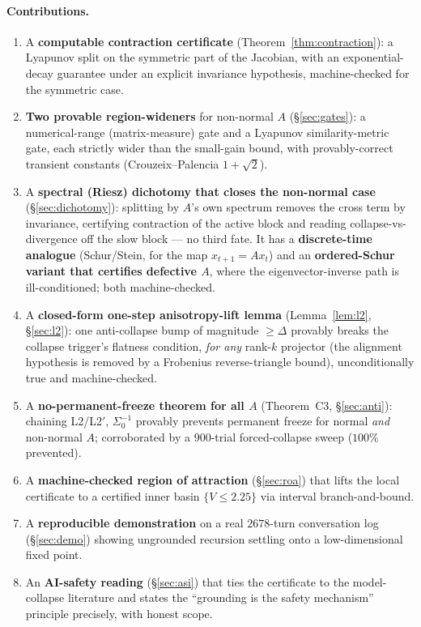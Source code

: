 \documentclass[11pt]{article}
\theoremstyle{definition}
\begin{document}
\paragraph{Contributions.}
\begin{enumerate}[leftmargin=1.4em]
\item A \textbf{computable contraction certificate} (Theorem~\ref{thm:contraction}): a
Lyapunov split on the symmetric part of the Jacobian, with an exponential-decay guarantee
under an explicit invariance hypothesis, machine-checked for the symmetric case.
\item \textbf{Two provable region-wideners} for non-normal $A$ (\S\ref{sec:gates}): a
numerical-range (matrix-measure) gate and a Lyapunov similarity-metric gate, each strictly
wider than the small-gain bound, with provably-correct transient constants
(Crouzeix--Palencia $1+\sqrt2$).
\item A \textbf{spectral (Riesz) dichotomy that closes the non-normal case}
(\S\ref{sec:dichotomy}): splitting by $A$'s own spectrum removes the cross term by
invariance, certifying contraction of the active block and reading collapse-vs-divergence off
the slow block --- no third fate. It has a \textbf{discrete-time analogue} (Schur/Stein, for
the map $x_{t+1}=Ax_t$) and an \textbf{ordered-Schur variant that certifies defective $A$},
where the eigenvector-inverse path is ill-conditioned; both machine-checked.
\item A \textbf{closed-form one-step anisotropy-lift lemma} (Lemma~\ref{lem:l2},
\S\ref{sec:l2}): one anti-collapse bump of magnitude $\ge\Delta$ provably breaks the
collapse trigger's flatness condition, \emph{for any} rank-$k$ projector (the alignment
hypothesis is removed by a Frobenius reverse-triangle bound), unconditionally true and
machine-checked.
\item A \textbf{no-permanent-freeze theorem for all $A$} (Theorem~C3, \S\ref{sec:anti}):
chaining L2/L2$'$, $\Sigma_0^{-1}$ provably prevents permanent freeze for normal \emph{and}
non-normal $A$; corroborated by a $900$-trial forced-collapse sweep ($100\%$ prevented).
\item A \textbf{machine-checked region of attraction} (\S\ref{sec:roa}) that lifts the local
certificate to a certified inner basin $\{V\le2.25\}$ via interval branch-and-bound.
\item A \textbf{reproducible demonstration} on a real $2678$-turn conversation log
(\S\ref{sec:demo}) showing ungrounded recursion settling onto a low-dimensional fixed
point.
\item An \textbf{AI-safety reading} (\S\ref{sec:asi}) that ties the certificate to the
model-collapse literature and states the ``grounding is the safety mechanism'' principle
precisely, with honest scope.
\end{enumerate}
\end{document}
